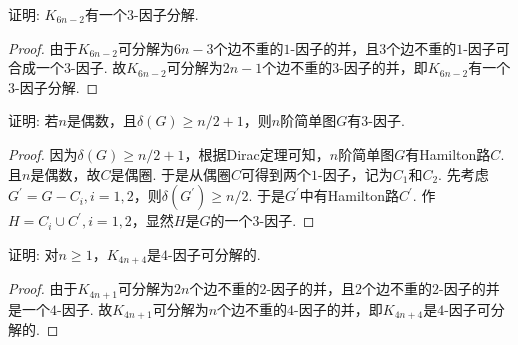 \documentclass[cn,blue,normal,founder,11pt]{elegantnote}
\begin{document}
\begin{example}
证明: \(K_{6n-2}\)有一个\(3\)-因子分解.
\end{example}

\begin{proof}
由于\(K_{6n-2}\)可分解为\(6n-3\)个边不重的\(1\)-因子的并，且\(3\)个边不重的\(1\)-因子可合成一个\(3\)-因子. 故\(K_{6n-2}\)可分解为\(2n-1\)个边不重的\(3\)-因子的并，即\(K_{6n-2}\)有一个\(3\)-因子分解.
\end{proof}

\begin{example}
证明: 若\(n\)是偶数，且\(\delta(G)\geqslant n/2+1\)，则\(n\)阶简单图\(G\)有\(3\)-因子.
\end{example}

\begin{proof}
因为\(\delta(G)\geqslant n/2+1\)，根据Dirac定理可知，\(n\)阶简单图\(G\)有Hamilton路\(C\). 且\(n\)是偶数，故\(C\)是偶圈. 于是从偶圈\(C\)可得到两个\(1\)-因子，记为\(C_1\)和\(C_2\). 先考虑\(G^{\prime}=G-C_i,i=1,2\)，则\(\delta(G^{\prime})\geqslant n/2\). 于是\(G^{\prime}\)中有Hamilton路\(C^{\prime}\). 作\(H=C_i\cup C^{\prime},i=1,2\)，显然\(H\)是\(G\)的一个\(3\)-因子.
\end{proof}

\begin{example}
证明: 对\(n\geqslant 1\)，\(K_{4n+4}\)是\(4\)-因子可分解的.
\end{example}

\begin{proof}
由于\(K_{4n+1}\)可分解为\(2n\)个边不重的\(2\)-因子的并，且\(2\)个边不重的\(2\)-因子的并是一个\(4\)-因子. 故\(K_{4n+1}\)可分解为\(n\)个边不重的\(4\)-因子的并，即\(K_{4n+4}\)是\(4\)-因子可分解的.
\end{proof}
\end{document}
